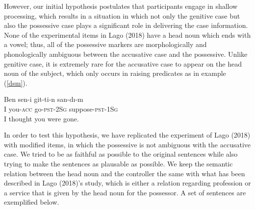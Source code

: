 \documentclass[11pt,a4paper]{article}
\begin{document}
However, our initial hypothesis postulates that participants engage in
shallow processing, which results in a situation in which not only the
genitive case but also the possessive case plays a significant role in
delivering the case information. None of the experimental items in Lago
(2018) have a head noun which ends with a vowel; thus, all of the
possessive markers are morphologically and phonologically ambiguous
between the accusative case and the possessive. Unlike genitive case, it
is extremely rare for the accusative case to appear on the head noun of
the subject, which only occurs in raising predicates as in example
(\ref{dsm}).

\begin{exe}
\ex \label{dsm}
\gll Ben sen-i git-ti-n san-d{\i}-m\\
I you-\textsc{acc} go-\textsc{pst}-\textsc{2Sg} suppose-\textsc{pst}-\textsc{1Sg}\\
\glt I thought you were gone.
\end{exe}

In order to test this hypothesis, we have replicated the experiment of
Lago (2018) with modified items, in which the possessive is not
ambiguous with the accusative case. We tried to be as faithful as
possible to the original sentences while also trying to make the
sentences as plausable as possible. We keep the semantic relation
between the head noun and the controller the same with what has been
described in Lago (2018)'s study, which is either a relation regarding
profession or a service that is given by the head noun for the
possessor. A set of sentences are exemplified below.
\end{document}
